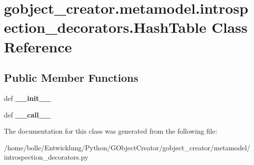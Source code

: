 \hypertarget{classgobject__creator_1_1metamodel_1_1introspection__decorators_1_1HashTable}{
\section{gobject\_\-creator.metamodel.introspection\_\-decorators.HashTable Class Reference}
\label{classgobject__creator_1_1metamodel_1_1introspection__decorators_1_1HashTable}
}
\subsection*{Public Member Functions}
\begin{DoxyCompactItemize}
\item 
\hypertarget{classgobject__creator_1_1metamodel_1_1introspection__decorators_1_1HashTable_ac5477819159e3bcf766c19b1190fae4e}{
def {\bfseries \_\-\_\-init\_\-\_\-}}
\label{classgobject__creator_1_1metamodel_1_1introspection__decorators_1_1HashTable_ac5477819159e3bcf766c19b1190fae4e}

\item 
\hypertarget{classgobject__creator_1_1metamodel_1_1introspection__decorators_1_1HashTable_a34291db74ac2715e66a4374ab3ffe02e}{
def {\bfseries \_\-\_\-call\_\-\_\-}}
\label{classgobject__creator_1_1metamodel_1_1introspection__decorators_1_1HashTable_a34291db74ac2715e66a4374ab3ffe02e}

\end{DoxyCompactItemize}


The documentation for this class was generated from the following file:\begin{DoxyCompactItemize}
\item 
/home/bolle/Entwicklung/Python/GObjectCreator/gobject\_\-creator/metamodel/introspection\_\-decorators.py\end{DoxyCompactItemize}
